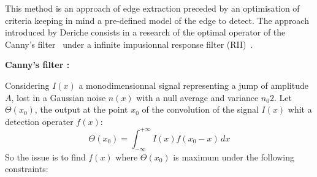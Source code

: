 This method is an approach of edge extraction preceded by an optimisation of criteria keeping in mind a pre-defined model of the edge to detect. 
The approach introduced by Deriche consists in a research of the optimal operator of the Canny's 
filter~\cite{canny:computational} under a infinite impusionnal response filter (RII)~\cite{deriche:using}.

\medskip
{\large \bf Canny's filter :}

\nopagebreak

Considering $I(x)$ a monodimensionnal signal representing a jump of amplitude $A$, lost in a Gaussian noise $n(x)$ with a null average and variance $n_{0}{2}$.
Let $\Theta (x_{0})$, the output at the point $x_{0}$ of the convolution of the signal $I(x)$ whit a detection operater $f(x)$:
\[ 
\Theta(x_{0}) = \int_{-\infty}^{+\infty}I(x) f(x_{0}-x)\,dx 
\]
So the issue is to find $f(x)$ where $\Theta (x_{0})$ is maximum under the following constraints:

